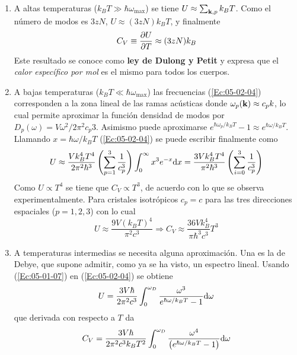 \begin{enumerate}
    \item A altas temperaturas ($k_BT \gg \hbar \omega_{\max}$) se tiene $U\approx \sum_{\mathbf{k},p} k_B T$. Como el número de modos es $3zN$, $U\approx (3zN)k_B T$, y finalmente 
    \begin{equation}
        C_V \equiv \frac{\partial U}{\partial T} \approx (3zN)k_B
    \end{equation}
    Este resultado se conoce como \textbf{ley de Dulong y Petit} y expresa que el \textit{calor específico por mol} es el mismo para todos los cuerpos. 
    \item A bajas temperaturas ($k_B T \ll \hbar \omega_{\max}$) las frecuencias (\ref{Ec:05-02-04}) corresponden a la zona lineal de las ramas acústicas donde $\omega_p (\mathbf{k}) \approx c_p k$, lo cual permite aproximar la función densidad de modos por $D_p (\omega) = V \omega^2 / 2 \pi^2 c_p3$. Asimismo puede aproximarse $e^{\hbar \omega_p/ k_B T} - 1 \approx e^{\hbar \omega / k_B T}$. Llamando $x=\hbar \omega / k_B T$  (\ref{Ec:05-02-04}) se puede escribir finalmente como 
    \begin{equation}
        U \approx \frac{Vk_B^4T^4}{2 \pi^2 \hbar^3} \left( \sum_{p=1}^3 \frac{1}{c_p^3} \right) \int_0^\infty x^3 e^{-x} \mathrm{d} x = \frac{3Vk_B^4 T^4}{\pi^2 \hbar^3} \left( \sum_{i=0}^3 \frac{1}{c_p^3} \right)
    \end{equation}
    Como $U\propto T^4$ se tiene que $C_V \propto T^3$, de acuerdo con lo que se observa experimentalmente. Para cristales isotrópicos $c_p=c$ para las tres direcciones espaciales ($p=1,2,3$) con lo cual
    \begin{equation}
        U \approx \frac{9V(k_B T)^4}{\pi^2 c^3} \Rightarrow C_V \approx \frac{36Vk_B^4}{\pi \hbar^3 c^3} T^3
    \end{equation}
    \item A temperaturas intermedias se necesita alguna aproximación. Una es la de Debye, que supone admitir, como ya se ha visto, un espectro lineal. Usando (\ref{Ec:05-01-07}) en (\ref{Ec:05-02-04}) se obtiene 
    \begin{equation}
        U = \frac{3V\hbar}{2 \pi^2 c^3} \int_0^{\omega_D} \frac{\omega^3}{e^{\hbar \omega/k_B T} - 1} \mathrm{d} \omega
    \end{equation}
    que derivada con respecto a $T$ da
    \begin{equation}
        C_V = \frac{3V\hbar}{2 \pi^2 c^3 k_B T^2} \int_0^{\omega_D} \frac{\omega^4}{\left( e^{\hbar \omega/k_B T} - 1 \right)} \mathrm{d} \omega
    \end{equation}

\end{enumerate}
